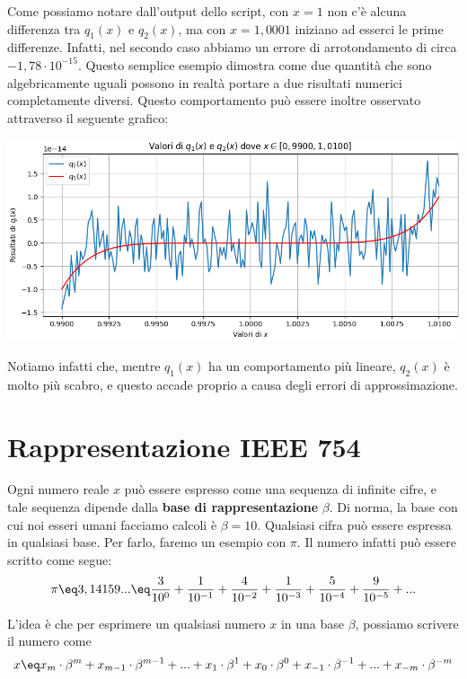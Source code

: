 \begin{example}
    Come possiamo notare dall'output dello script, con $x = 1$ non c'è alcuna differenza tra $q_1(x)$ e $q_2(x)$, ma con $x = 1,0001$ iniziano ad esserci le prime differenze. Infatti, nel secondo caso abbiamo un errore di arrotondamento di circa $-1,78 \cdot 10^{-15}$. Questo semplice esempio dimostra come due quantità che sono algebricamente uguali possono in realtà portare a due risultati numerici completamente diversi.
    \nl
    Questo comportamento può essere inoltre osservato attraverso il seguente grafico:
    \begin{center}
        \includegraphics[width = \linewidth]{assets/image-001.png}
    \end{center}

    Notiamo infatti che, mentre $q_1(x)$ ha un comportamento più lineare, $q_2(x)$ è molto più scabro, e questo accade proprio a causa degli errori di approssimazione.
\end{example}

\section{Rappresentazione IEEE 754}

Ogni numero reale $x$ può essere espresso come una sequenza di infinite cifre, e tale sequenza dipende dalla \textbf{base di rappresentazione} $\beta$. Di norma, la base con cui noi esseri umani facciamo calcoli è $\beta = 10$.
\nl
Qualsiasi cifra può essere espressa in qualsiasi base. Per farlo, faremo un esempio con $\pi$. Il numero infatti può essere scritto come segue:
\[ \pi \eq 3,14159... \eq \frac{3}{10^0} + \frac{1}{10^{-1}} + \frac{4}{10^{-2}} + \frac{1}{10^{-3}} + \frac{5}{10^{-4}} + \frac{9}{10^{-5}} + ... \]

L'idea è che per esprimere un qualsiasi numero $x$ in una base $\beta$, possiamo scrivere il numero come
\[ x \eq x_m \cdot \beta^m + x_{m-1} \cdot \beta^{m-1} + ... + x_{1} \cdot \beta^{1} + x_{0} \cdot \beta^{0} + x_{-1} \cdot \beta^{-1} + ... + x_{-m} \cdot \beta^{-m} \]

